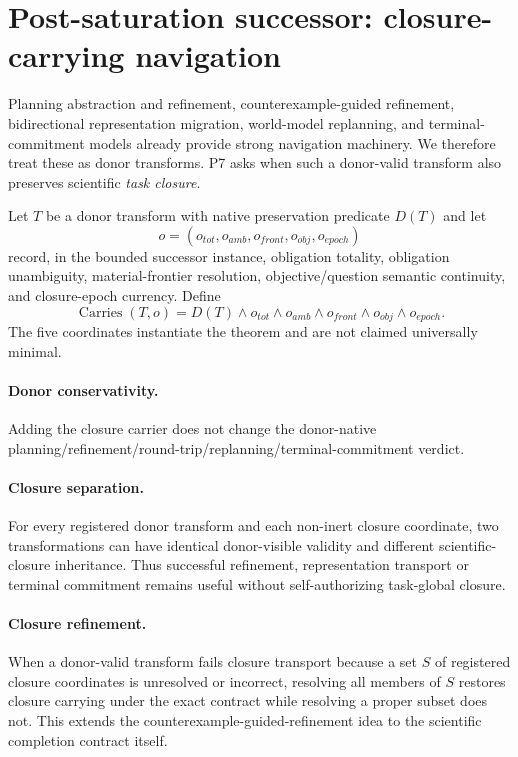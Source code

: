 \section{Post-saturation successor: closure-carrying navigation}

Planning abstraction and refinement, counterexample-guided refinement, bidirectional representation migration, world-model replanning, and terminal-commitment models already provide strong navigation machinery. We therefore treat these as donor transforms. P7 asks when such a donor-valid transform also preserves scientific \emph{task closure}.

Let $T$ be a donor transform with native preservation predicate $D(T)$ and let
\[
o=(o_{tot},o_{amb},o_{front},o_{obj},o_{epoch})
\]
record, in the bounded successor instance, obligation totality, obligation unambiguity, material-frontier resolution, objective/question semantic continuity, and closure-epoch currency. Define
\[
\operatorname{Carries}(T,o)=D(T)\wedge o_{tot}\wedge o_{amb}\wedge o_{front}\wedge o_{obj}\wedge o_{epoch}.
\]
The five coordinates instantiate the theorem and are not claimed universally minimal.

\paragraph{Donor conservativity.}
Adding the closure carrier does not change the donor-native planning/refinement/round-trip/replanning/terminal-commitment verdict.

\paragraph{Closure separation.}
For every registered donor transform and each non-inert closure coordinate, two transformations can have identical donor-visible validity and different scientific-closure inheritance. Thus successful refinement, representation transport or terminal commitment remains useful without self-authorizing task-global closure.

\paragraph{Closure refinement.}
When a donor-valid transform fails closure transport because a set $S$ of registered closure coordinates is unresolved or incorrect, resolving all members of $S$ restores closure carrying under the exact contract while resolving a proper subset does not. This extends the counterexample-guided-refinement idea to the scientific completion contract itself.

